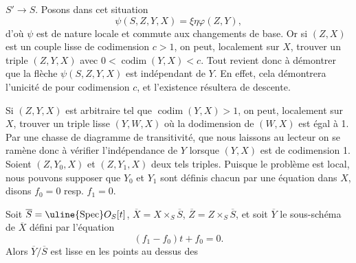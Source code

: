 
 $S'\longrightarrow S$. Posons dans cet situation
\[
\psi(S,Z,Y,X)=\xi\eta\varphi(Z,Y),
\]
d'où $\psi$ est de nature locale et commute aux changements de base. Or si $(Z,X)$ est un couple lisse de codimension $c>1$, on peut, localement sur $X$, trouver un triple $(Z,Y,X)$ avec $0<\operatorname{codim}(Y,X)<c$. Tout revient donc à démontrer que la flèche $\psi(S,Z,Y,X)$ est indépendant de $Y$. En effet, cela démontrera l'unicité de \qquad pour codimension $c$, et l'existence résultera de descente.

Si $(Z,Y,X)$ est arbitraire tel que $\operatorname{codim}(Y,X)>1$, on peut, localement sur $X$, trouver un triple lisse $(Y,W,X)$ où la dodimension de $(W,X)$ est égal à 1. Par une chasse de diagramme de transitivité, que nous laissons au lecteur\unsure{\}|,} on se ramène donc à vérifier l'indépendance de $Y$ lorsque $(Y,X)$ est de codimension 1. Soient  $(Z,Y_0,X)$ et $(Z,Y_1,X)$ deux tels triples. Puisque le problème est local, nous pouvons supposer que $Y_0$ et $Y_1$ sont définis chacun par une équation dans $X$, disons $f_0=0$ resp. $f_1=0$.

Soit $\overline S=\uline{\operatorname{Spec}}O_S[t]$, $\overline X=X\times_S\overline S$, $\overline Z=Z\times_S\overline S$, et soit $\overline Y$ le sous-schéma de $\overline X$ défini par l'équation
\[
(f_1-f_0)t+f_0=0.
\]
Alors $\overline Y/\overline S$ est lisse en les points au dessus des
